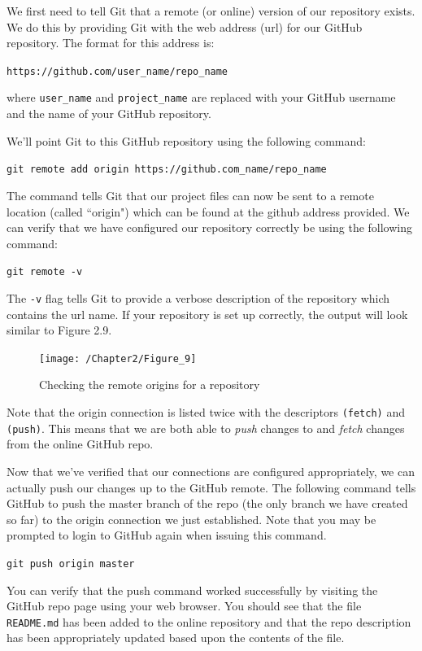\documentclass{book}
\begin{document}
We first need to tell Git that a remote (or online) version of our repository exists. We do this by providing Git with the web address (url) for our GitHub repository. The format for this address is:

\texttt{https://github.com/user\_name/repo\_name}

where \texttt{user\_name} and \texttt{project\_name} are replaced with your GitHub username and the name of your GitHub repository.

We'll point Git to this GitHub repository using the following command:

\texttt{git remote add origin https://github.com\_name/repo\_name}

The command tells Git that our project files can now be sent to a remote location (called ``origin") which can be found at the github address provided. We can verify that we have configured our repository correctly be using the following command:

\texttt{git remote -v}

The \texttt{-v} flag tells Git to provide a verbose description of the repository which contains the url name. If your repository is set up correctly, the output will look similar to Figure 2.9.

\begin{figure}[h]
	\caption{Checking the remote origins for a repository}
	\centering\texttt{[image: /Chapter2/Figure\_9]}
\end{figure}

Note that the origin connection is listed twice with the descriptors \texttt{(fetch)} and \texttt{(push)}. This means that we are both able to \textit{push} changes to and \textit{fetch} changes from the online GitHub repo.

Now that we've verified that our connections are configured appropriately, we can actually push our changes up to the GitHub remote. The following command tells GitHub to push the master branch of the repo (the only branch we have created so far) to the origin connection we just established. Note that you may be prompted to login to GitHub again when issuing this command.

\texttt{git push origin master}

You can verify that the push command worked successfully by visiting the GitHub repo page using your web browser. You should see that the file \texttt{README.md} has been added to the online repository and that the repo description has been appropriately updated based upon the contents of the file.
\end{document}
